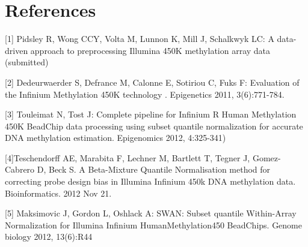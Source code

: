 \documentclass[11pt]{article}
\begin{document}
\section{References}
[1] Pidsley R, Wong CCY, Volta M, Lunnon K, Mill J, Schalkwyk LC: 
A data-driven approach to preprocessing Illumina 450K methylation 
array data (submitted)

[2] Dedeurwaerder S, Defrance M, Calonne E, Sotiriou C, Fuks F: 
Evaluation of the Infinium Methylation 450K technology . Epigenetics 
2011, 3(6):771-784.

[3] Touleimat N, Tost J: Complete pipeline for Infinium R Human 
Methylation 450K BeadChip data processing using subset quantile 
normalization for accurate DNA methylation estimation. Epigenomics 
2012, 4:325-341)

[4]Teschendorff AE, Marabita F, Lechner M, Bartlett T, Tegner J, Gomez-Cabrero D,
Beck S. A Beta-Mixture Quantile Normalisation method for correcting probe design 
bias in Illumina Infinium 450k DNA methylation data. Bioinformatics. 2012 Nov 21.

[5] Maksimovic J, Gordon L, Oshlack A: SWAN: Subset quantile 
Within-Array Normalization for Illumina Infinium HumanMethylation450 
BeadChips. Genome biology 2012, 13(6):R44
\end{document}
